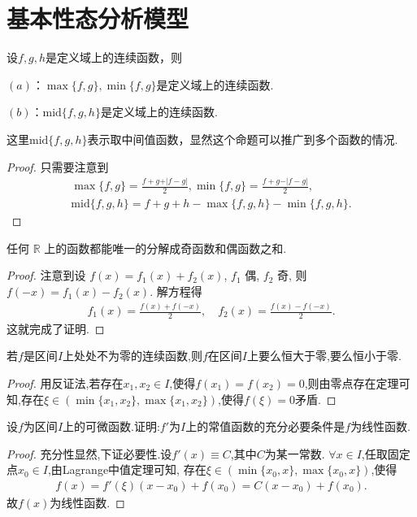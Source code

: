 \documentclass[../../main.tex]{subfiles}%
\begin{document}
\section{基本性态分析模型}

\begin{proposition}[多个函数取最值或者中间值]\label{proposition:多个函数取最值或者中间值}
设\(f,g,h\)是定义域上的连续函数，则

\((a)\)：\(\max\{f,g\}, \min\{f,g\}\)是定义域上的连续函数.

\((b)\)：\(\text{mid}\{f,g,h\}\)是定义域上的连续函数.
\end{proposition}
\begin{remark}
这里\(\text{mid}\{f,g,h\}\)表示取中间值函数，显然这个命题可以推广到多个函数的情况.
\end{remark}
\begin{proof}
只需要注意到
\begin{gather*}
\max\{f,g\}=\frac{f + g+\vert f - g\vert}{2},
\min\{f,g\}=\frac{f + g-\vert f - g\vert}{2},\\
\text{mid}\{f,g,h\}=f + g + h-\max\{f,g,h\}-\min\{f,g,h\}.
\end{gather*}
\end{proof}

\begin{lemma}\label{lemma:函数的奇偶函数分解}
任何 $\mathbb{R}$ 上的函数都能唯一的分解成奇函数和偶函数之和.
\end{lemma}
\begin{proof}
注意到设 $f(x) = f_1(x) + f_2(x)$, $f_1$ 偶, $f_2$ 奇, 则 $f(-x) = f_1(x) - f_2(x)$. 解方程得
\begin{align*}
f_1(x) = \frac{f(x) + f(-x)}{2}, \quad f_2(x) = \frac{f(x) - f(-x)}{2}.
\end{align*}
这就完成了证明.
\end{proof}

\begin{proposition}\label{proposition:连续函数无零点则一定恒大于零或恒小于零}
若\(f\)是区间\(I\)上处处不为零的连续函数,则\(f\)在区间\(I\)上要么恒大于零,要么恒小于零.
\end{proposition}
\begin{proof}
用反证法,若存在$x_1,x_2\in I$,使得$f(x_1)=f(x_2)=0$,则由零点存在定理可知,存在$\xi \in (\min\{x_1,x_2\},\max\{x_1,x_2\})$,使得$f(\xi)=0$矛盾.
\end{proof}

\begin{proposition}\label{proposition:导数为常数的函数必是线性函数}
设\(f\)为区间\(I\)上的可微函数.证明:\(f'\)为\(I\)上的常值函数的充分必要条件是\(f\)为线性函数.
\end{proposition}
\begin{proof}
充分性显然,下证必要性.设$f'(x)\equiv C$,其中$C$为某一常数.
$\forall x\in I$,任取固定点$x_0\in I$,由Lagrange中值定理可知,
存在$\xi\in(\min\{x_0,x\},\max\{x_0,x\})$,使得
\begin{align*}
f(x)=f'(\xi)(x-x_0)+f(x_0)=C(x-x_0)+f(x_0).
\end{align*}
故$f(x)$为线性函数.
\end{proof}
\end{document}
